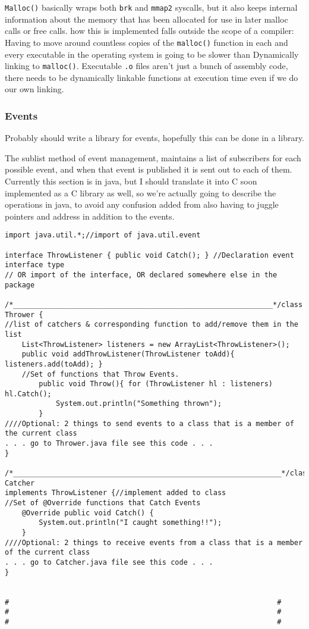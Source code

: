 \texttt{Malloc()} basically wraps both \texttt{brk} and \texttt{mmap2}
syscalls, but it also keeps internal information about the memory that
has been allocated for use in later malloc calls or free calls. how this
is implemented falls outside the scope of a compiler: Having to move
around countless copies of the \texttt{malloc()} function in each and
every executable in the operating system is going to be slower than
Dynamically linking to \texttt{malloc()}. Executable \texttt{.o} files
aren't just a bunch of assembly code, there needs to be dynamically
linkable functions at execution time even if we do our own linking.

\hypertarget{events}{%
\subsubsection{Events}\label{events}}

Probably should write a library for events, hopefully this can be done
in a library.

The sublist method of event management, maintains a list of subscribers
for each possible event, and when that event is published it is sent out
to each of them. Currently this section is in java, but I should
translate it into C soon implemented as a C library as well, so we're
actually going to describe the operations in java, to avoid any
confusion added from also having to juggle pointers and address in
addition to the events.

\begin{verbatim}
import java.util.*;//import of java.util.event

interface ThrowListener { public void Catch(); } //Declaration event interface type
// OR import of the interface, OR declared somewhere else in the package

/*_____________________________________________________________*/class Thrower {
//list of catchers & corresponding function to add/remove them in the list
    List<ThrowListener> listeners = new ArrayList<ThrowListener>();
    public void addThrowListener(ThrowListener toAdd){ listeners.add(toAdd); }
    //Set of functions that Throw Events.
        public void Throw(){ for (ThrowListener hl : listeners) hl.Catch();
            System.out.println("Something thrown");
        }
////Optional: 2 things to send events to a class that is a member of the current class
. . . go to Thrower.java file see this code . . .
}

/*_______________________________________________________________*/class Catcher
implements ThrowListener {//implement added to class
//Set of @Override functions that Catch Events
    @Override public void Catch() {
        System.out.println("I caught something!!");
    }
////Optional: 2 things to receive events from a class that is a member of the current class
. . . go to Catcher.java file see this code . . .
}


#                                                               #
#                                                               #
#                                                               #
\end{verbatim}

